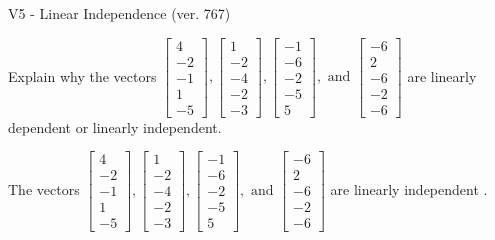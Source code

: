 \begin{exercise}
  \begin{exerciseTitle}V5 - Linear Independence (ver. 767)\end{exerciseTitle}
  \begin{exerciseStatement}
    Explain why the vectors \(\left[\begin{array}{r}
4 \\
-2 \\
-1 \\
1 \\
-5
\end{array}\right] , \left[\begin{array}{r}
1 \\
-2 \\
-4 \\
-2 \\
-3
\end{array}\right] , \left[\begin{array}{r}
-1 \\
-6 \\
-2 \\
-5 \\
5
\end{array}\right] , \text{ and } \left[\begin{array}{r}
-6 \\
2 \\
-6 \\
-2 \\
-6
\end{array}\right]\) are linearly dependent or linearly independent.	


  \end{exerciseStatement}
  \begin{exerciseAnswer}
   The vectors \(\left[\begin{array}{r}
4 \\
-2 \\
-1 \\
1 \\
-5
\end{array}\right] , \left[\begin{array}{r}
1 \\
-2 \\
-4 \\
-2 \\
-3
\end{array}\right] , \left[\begin{array}{r}
-1 \\
-6 \\
-2 \\
-5 \\
5
\end{array}\right] , \text{ and } \left[\begin{array}{r}
-6 \\
2 \\
-6 \\
-2 \\
-6
\end{array}\right]\) are 
  	 linearly independent  .
  


  \end{exerciseAnswer}
\end{exercise}
